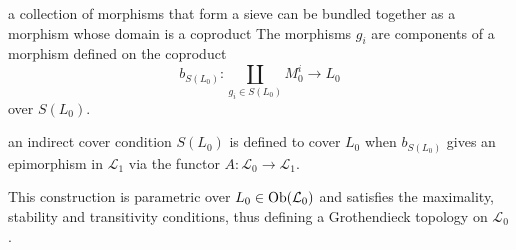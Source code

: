 \begin{frame}
\begin{block}{a collection of morphisms that form a sieve can be bundled together as a morphism whose domain is a coproduct}
The morphisms $g_i$ are components of a morphism defined on the coproduct
$$
b_{S(L_0)} : \coprod\limits_{g_i \in S(L_0)} M_0^i \longrightarrow L_0
$$
over $S(L_0)$. 
\end{block}
\begin{block}{an indirect cover condition}
$S(L_0)$ is defined to cover $L_0$ when $b_{S(L_0)}$ gives an epimorphism in $\mathcal{L}_1$ via the functor $A:\mathcal{L}_0 \rightarrow \mathcal{L}_1$.
\end{block}
This construction is parametric over $L_0 \in \mathop{\rm Ob}\nolimits(\mathcal{L}_0)$ and satisfies the maximality, stability and transitivity conditions, thus defining a Grothendieck topology on $\mathcal{L}_0$. 
\end{frame}